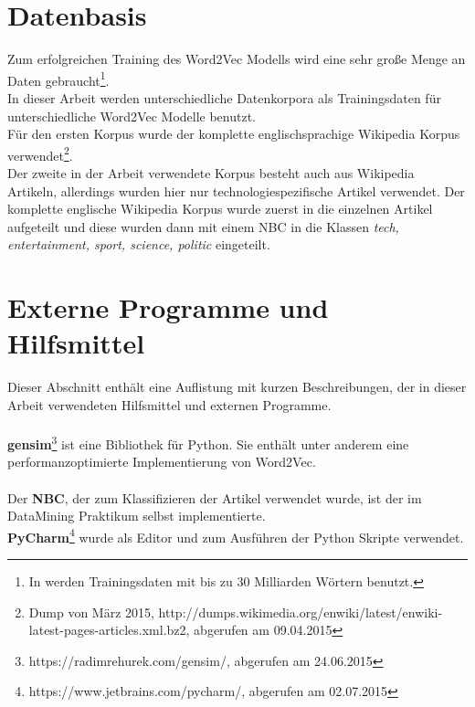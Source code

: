 \documentclass[12pt,a4paper]{report}
\begin{document}
	\section{Datenbasis}
	Zum erfolgreichen Training des Word2Vec Modells wird eine sehr große Menge an Daten gebraucht\footnote{In \cite{DBLP:journals/corr/MikolovSCCD13} werden Trainingsdaten mit bis zu 30 Milliarden Wörtern benutzt.}. \\
	In dieser Arbeit werden unterschiedliche Datenkorpora als Trainingsdaten für unterschiedliche Word2Vec Modelle benutzt.\\	
	Für den ersten Korpus wurde der komplette englischsprachige Wikipedia Korpus verwendet\footnote{Dump von März 2015, http://dumps.wikimedia.org/enwiki/latest/enwiki-latest-pages-articles.xml.bz2, abgerufen am 09.04.2015}.\\
	Der zweite in der Arbeit verwendete Korpus besteht auch aus Wikipedia Artikeln, allerdings wurden hier nur technologiespezifische Artikel verwendet. Der komplette englische Wikipedia Korpus wurde zuerst in die einzelnen Artikel aufgeteilt und diese wurden dann mit einem NBC in die Klassen \textit{tech, entertainment, sport, science, politic} eingeteilt.\\
	


	\section{Externe Programme und Hilfsmittel}
	Dieser Abschnitt enthält eine Auflistung mit kurzen Beschreibungen, der in dieser Arbeit verwendeten Hilfsmittel und externen Programme.\\
	\vspace{1em}\\	
	\textbf{gensim}\cite{rehurek_lrec}\footnote{https://radimrehurek.com/gensim/, abgerufen am 24.06.2015} ist eine Bibliothek für Python. Sie enthält unter anderem eine performanzoptimierte Implementierung von Word2Vec.\\ 
	\vspace{1em}\\
	Der \textbf{NBC}, der zum Klassifizieren der Artikel verwendet wurde, ist der im DataMining Praktikum selbst implementierte.
	\vspace{1em}\\
	\textbf{PyCharm}\footnote{https://www.jetbrains.com/pycharm/, abgerufen am 02.07.2015} wurde als Editor und zum Ausführen der Python Skripte verwendet.
	
\end{document}
